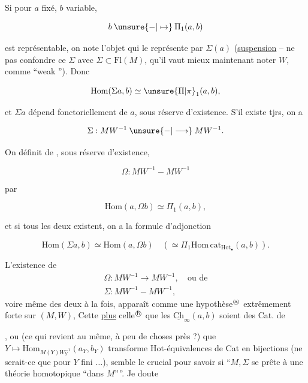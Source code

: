 
Si pour $a$ fixé, $b$ variable, 

\[
 b\mathbin{\unsure{-|\mapsto}}\Pi_1(a,b)
\]

est représentable, on note l'objet qui le représente par $\Sigma(a)$  (\uline{suspension} -- ne pas confondre ce $\Sigma$ avec $\Sigma\subset\mathrm{Fl}(M)$, qu'il vaut mieux maintenant noter $W$, comme ``weak ''). Donc

\[
 \mathrm{Hom}(\Sigma a,b)\simeq\unsure{\Pi|\pi}_1(a,b),
\]

et $\Sigma a$ dépend fonctoriellement de $a$, sous réserve d'existence. S'il existe tjrs, on a

\[
 \Sigma:MW^{-1}\mathbin{\unsure{-|\longrightarrow}}MW^{-1}.
\]

On définit de , sous réserve d'existence,

\[
 \Omega:MW^{-1}\mathbin{-}MW^{-1}
\]

par

\[
 \mathrm{Hom}(a,\Omega b)\simeq\Pi_1(a,b),
\]

et si tous les deux existent, on a la formule d'adjonction

\[
 \mathrm{Hom}(\Sigma a,b)\simeq\mathrm{Hom}(a,\Omega b)
 \quad(\simeq\Pi_1\mathrm{Hom\,cat}_{\mathrm{Hot}_{\bullet}}(a,b)).
\]

 L'existence de
\[
 \begin{aligned}
 \Omega:MW^{-1}\longrightarrow MW^{-1},&\ \text{ou de}\\
 \Sigma:MW^{-1}\mathbin{-}MW^{-1},&
 \end{aligned}
\]
voire même des deux à la fois, apparaît comme une hypothèse$^{\text{\textcircled{\scriptsize a}}}$ extrêmement forte sur $(M,W)$,  Cette   \uline{plus} celle$^{\text{\textcircled{\scriptsize b}}}$ que les $\underline{\mathrm{Ch}}_{\infty}(a,b)$ soient  des Cat. de

,  ou (ce qui revient au même, à peu de choses près ?) que $Y\longmapsto\mathrm{Hom}_{M(Y)W_Y^{-1}}(a_Y,b_Y)$ transforme Hot-équivalences de Cat en bijections (ne serait-ce que pour $Y$ fini $\ldots$), semble le  crucial pour savoir si ``$M,\Sigma$ se prête à une théorie  \deleted{\unsure{$\Sigma$}} homotopique ``dans $M$''''. Je doute 

